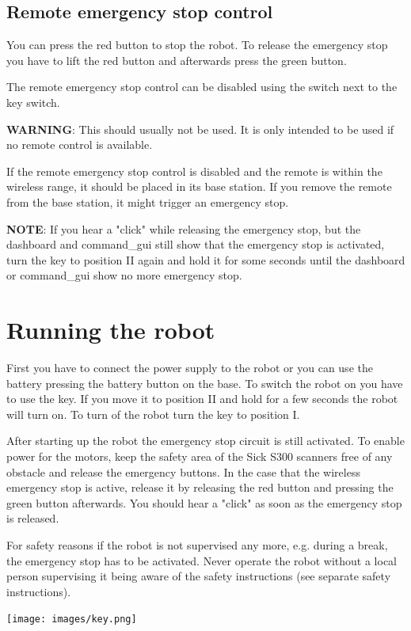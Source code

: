 \subsection{Remote emergency stop control}
You can press the red button to stop the robot. To release the emergency stop you have to lift the red button and afterwards press the green button.

The remote emergency stop control can be disabled using the switch next to the key switch.

\textbf{WARNING}: This should usually not be used. It is only intended to be used if no remote control is available.

If the remote emergency stop control is disabled and the remote is within the wireless range, it should be placed in its base station. If you remove the remote from the base station, it might trigger an emergency stop.

\textbf{NOTE}: If you hear a "click" while releasing the emergency stop, but the dashboard and command\_gui still show that the emergency stop is activated, turn the key to position II again and hold it for some seconds until the dashboard or command\_gui show no more emergency stop.


\section{Running the robot}
First you have to connect the power supply to the robot or you can use the battery pressing the battery button on the base. To switch the robot on you have to use the key. If you move it to position II and hold for a few seconds the robot will turn on. To turn of the robot turn the key to position I. 

After starting up the robot the emergency stop circuit is still activated. To enable power for the motors, keep the safety area of the Sick S300 scanners free of any obstacle and release the emergency buttons. In the case that the wireless emergency stop is active, release it by releasing the red button and pressing the green button afterwards. You should hear a "click" as soon as the emergency stop is released.

For safety reasons if the robot is not supervised any more, e.g. during a break, the emergency stop has to be activated. Never operate the robot without a local person supervising it being aware of the safety instructions (see separate safety instructions).

\begin{center}
\texttt{[image: images/key.png]}
\end{center}


